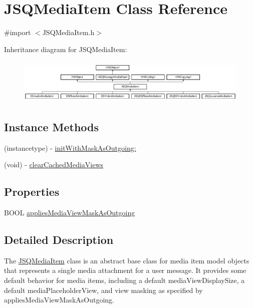 \hypertarget{interface_j_s_q_media_item}{}\section{J\+S\+Q\+Media\+Item Class Reference}
\label{interface_j_s_q_media_item}


{\ttfamily \#import $<$J\+S\+Q\+Media\+Item.\+h$>$}

Inheritance diagram for J\+S\+Q\+Media\+Item\+:\begin{figure}[H]
\begin{center}
\leavevmode
\includegraphics[height=2.183236cm]{interface_j_s_q_media_item}
\end{center}
\end{figure}
\subsection*{Instance Methods}
\begin{DoxyCompactItemize}
\item 
(instancetype) -\/ \hyperlink{interface_j_s_q_media_item_a4fbe76f4a63410540b9d5e7a417d0ad1}{init\+With\+Mask\+As\+Outgoing\+:}
\item 
(void) -\/ \hyperlink{interface_j_s_q_media_item_a561cf3f49ca3d9188d66d07ad13b6b6f}{clear\+Cached\+Media\+Views}
\end{DoxyCompactItemize}
\subsection*{Properties}
\begin{DoxyCompactItemize}
\item 
B\+O\+O\+L \hyperlink{interface_j_s_q_media_item_a1fdf831927e6290df2fdceb724ec8046}{applies\+Media\+View\+Mask\+As\+Outgoing}
\end{DoxyCompactItemize}


\subsection{Detailed Description}
The {\ttfamily \hyperlink{interface_j_s_q_media_item}{J\+S\+Q\+Media\+Item}} class is an abstract base class for media item model objects that represents a single media attachment for a user message. It provides some default behavior for media items, including a default media\+View\+Display\+Size, a default media\+Placeholder\+View, and view masking as specified by applies\+Media\+View\+Mask\+As\+Outgoing.

